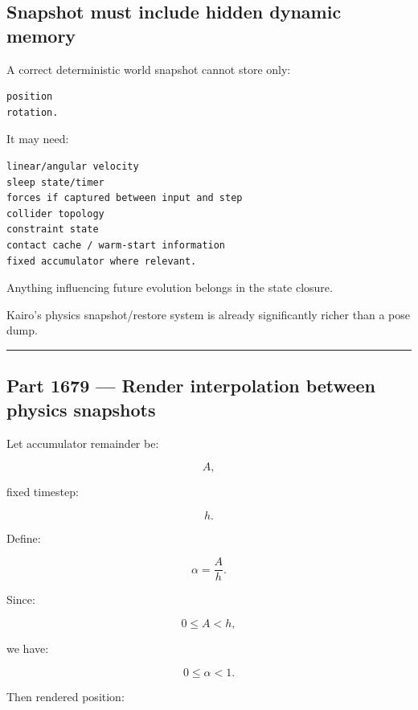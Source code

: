 \subsection{Snapshot must include hidden dynamic memory}\label{06-engine-ii-ch037-snapshot-must-include-hidden-dynamic-memory}

\hypertarget{06-engine-ii-ch037-snapshot-must-include-hidden-dynamic-memory}{}

A correct deterministic world snapshot cannot store only:

\begin{verbatim}
position
rotation.
\end{verbatim}

It may need:

\begin{verbatim}
linear/angular velocity
sleep state/timer
forces if captured between input and step
collider topology
constraint state
contact cache / warm-start information
fixed accumulator where relevant.
\end{verbatim}

Anything influencing future evolution belongs in the state closure.

Kairo's physics snapshot/restore system is already significantly richer than a pose dump.

\begin{center}\rule{0.5\linewidth}{0.5pt}\end{center}

\subsection{Part 1679 --- Render interpolation between physics snapshots}\label{06-engine-ii-ch037-part-1679-render-interpolation-between-physics-snapshots}

\hypertarget{06-engine-ii-ch037-part-1679-render-interpolation-between-physics-snapshots}{}

Let accumulator remainder be:

\[
A,
\]

fixed timestep:

\[
h.
\]

Define:

\[
\boxed{
\alpha
=
\frac{A}{h}.
}
\]

Since:

\[
0\le A<h,
\]

we have:

\[
0\le\alpha<1.
\]

Then rendered position:

